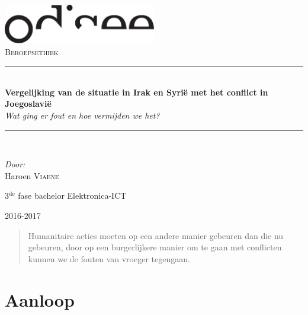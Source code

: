 \documentclass[a4paper]{article}
\newcommand{\HRule}{\rule{\linewidth}{0.5mm}}
\begin{document}
\begin{titlepage}
\begin{center}
\includegraphics[width=0.5\textwidth]{src/logo.pdf}~\\[1cm]


\textsc{\Large Beroepsethiek}\\[0.5cm]

\HRule \\[0.4cm]
{ \LARGE \bfseries Vergelijking van de situatie in Irak en Syrië met het conflict in Joegoslavië }\\[0.4cm]
{\large \textit{Wat ging er fout en hoe vermijden we het?}}\\[0.2cm]

\HRule \\[1.5cm]

\begin{minipage}{0.4\textwidth}
\begin{flushleft} \large
\emph{Door:}\\
Haroen \textsc{Viaene}\\

\end{flushleft}
\end{minipage}
\begin{minipage}{0.4\textwidth}
\begin{flushright} \large
\large{3$^{\text{de}}$ fase bachelor Elektronica-ICT}\\
\end{flushright}
\end{minipage}

\vfill

{\large 2016-2017}

\end{center}
\end{titlepage}

\newpage

\begin{abstract}
\noindent Humanitaire acties moeten op een andere manier gebeuren dan die nu gebeuren, door op een burgerlijkere manier om te gaan met conflicten kunnen we de fouten van vroeger tegengaan.
\end{abstract}

\section{Aanloop} %
\label{sec:aanloop}
\end{document}
